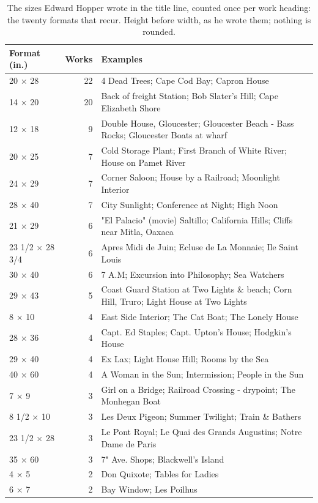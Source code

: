 \begin{table}[htbp]\centering\small
\caption{The sizes Edward Hopper wrote in the title line, counted once per work heading: the twenty formats that recur. Height before width, as he wrote them; nothing is rounded.}\label{tab:formats}
\begin{tabular}{lrp{7.5cm}}\toprule Format (in.) & Works & Examples\\\midrule
20 × 28 & 22 & 4 Dead Trees; Cape Cod Bay; Capron House\\
14 × 20 & 20 & Back of freight Station; Bob Slater's Hill; Cape Elizabeth Shore\\
12 × 18 & 9 & Double House, Gloucester; Gloucester Beach - Bass Rocks; Gloucester Boats at wharf\\
20 × 25 & 7 & Cold Storage Plant; First Branch of White River; House on Pamet River\\
24 × 29 & 7 & Corner Saloon; House by a Railroad; Moonlight Interior\\
28 × 40 & 7 & City Sunlight; Conference at Night; High Noon\\
21 × 29 & 6 & "El Palacio" (movie) Saltillo; California Hills; Cliffs near Mitla, Oaxaca\\
23 1/2 × 28 3/4 & 6 & Apres Midi de Juin; Ecluse de La Monnaie; Ile Saint Louis\\
30 × 40 & 6 & 7 A.M; Excursion into Philosophy; Sea Watchers\\
29 × 43 & 5 & Coast Guard Station at Two Lights \& beach; Corn Hill, Truro; Light House at Two Lights\\
8 × 10 & 4 & East Side Interior; The Cat Boat; The Lonely House\\
28 × 36 & 4 & Capt. Ed Staples; Capt. Upton's House; Hodgkin's House\\
29 × 40 & 4 & Ex Lax; Light House Hill; Rooms by the Sea\\
40 × 60 & 4 & A Woman in the Sun; Intermission; People in the Sun\\
7 × 9 & 3 & Girl on a Bridge; Railroad Crossing - drypoint; The Monhegan Boat\\
8 1/2 × 10 & 3 & Les Deux Pigeon; Summer Twilight; Train \& Bathers\\
23 1/2 × 28 & 3 & Le Pont Royal; Le Quai des Grands Augustins; Notre Dame de Paris\\
35 × 60 & 3 & 7" Ave. Shops; Blackwell's Island\\
4 × 5 & 2 & Don Quixote; Tables for Ladies\\
6 × 7 & 2 & Bay Window; Les Poilhus\\
\bottomrule\end{tabular}\end{table}

